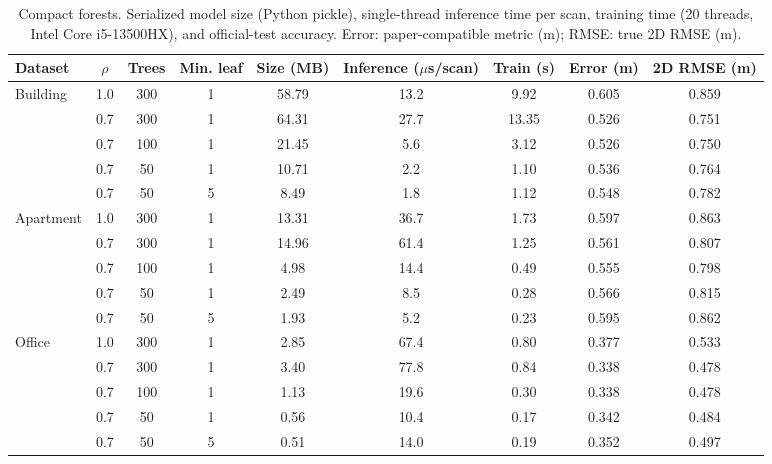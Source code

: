\begin{table}[!t]
\centering
\caption{Compact forests. Serialized model size (Python pickle), single-thread inference time per scan, training time (20 threads, Intel Core i5-13500HX), and official-test accuracy. Error: paper-compatible metric (m); RMSE: true 2D RMSE (m).}
\label{tab:compact_models}
\footnotesize
\setlength{\tabcolsep}{4pt}
\begin{tabular}{lcccccccc}
\toprule
Dataset & $\rho$ & Trees & Min. leaf & Size (MB) & Inference ($\mu$s/scan) & Train (s) & Error (m) & 2D RMSE (m) \\
\midrule
Building & 1.0 & 300 & 1 & 58.79 & 13.2 & 9.92 & 0.605 & 0.859 \\
 & 0.7 & 300 & 1 & 64.31 & 27.7 & 13.35 & 0.526 & 0.751 \\
 & 0.7 & 100 & 1 & 21.45 & 5.6 & 3.12 & 0.526 & 0.750 \\
 & 0.7 & 50 & 1 & 10.71 & 2.2 & 1.10 & 0.536 & 0.764 \\
 & 0.7 & 50 & 5 & 8.49 & 1.8 & 1.12 & 0.548 & 0.782 \\
\midrule
Apartment & 1.0 & 300 & 1 & 13.31 & 36.7 & 1.73 & 0.597 & 0.863 \\
 & 0.7 & 300 & 1 & 14.96 & 61.4 & 1.25 & 0.561 & 0.807 \\
 & 0.7 & 100 & 1 & 4.98 & 14.4 & 0.49 & 0.555 & 0.798 \\
 & 0.7 & 50 & 1 & 2.49 & 8.5 & 0.28 & 0.566 & 0.815 \\
 & 0.7 & 50 & 5 & 1.93 & 5.2 & 0.23 & 0.595 & 0.862 \\
\midrule
Office & 1.0 & 300 & 1 & 2.85 & 67.4 & 0.80 & 0.377 & 0.533 \\
 & 0.7 & 300 & 1 & 3.40 & 77.8 & 0.84 & 0.338 & 0.478 \\
 & 0.7 & 100 & 1 & 1.13 & 19.6 & 0.30 & 0.338 & 0.478 \\
 & 0.7 & 50 & 1 & 0.56 & 10.4 & 0.17 & 0.342 & 0.484 \\
 & 0.7 & 50 & 5 & 0.51 & 14.0 & 0.19 & 0.352 & 0.497 \\
\bottomrule
\end{tabular}
\end{table}
